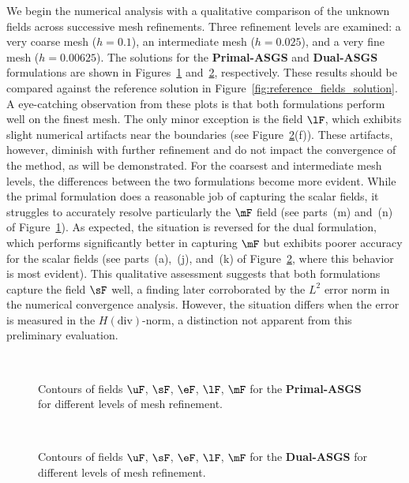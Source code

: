 We begin the numerical analysis with a qualitative comparison of the unknown fields across successive mesh refinements. Three refinement levels are examined: a very coarse mesh ($h = 0.1$), an intermediate mesh ($h = 0.025$), and a very fine mesh ($h = 0.00625$). The solutions for the \textbf{Primal-ASGS} and \textbf{Dual-ASGS} formulations are shown in Figures~\ref{fig:primal_formulation_fields_solution} and~\ref{fig:dual_formulation_fields_solution}, respectively. These results should be compared against the reference solution in Figure~\ref{fig:reference_fields_solution}.
A eye-catching observation from these plots is that both formulations perform well on the finest mesh. The only minor exception is the field $\lF$, which exhibits slight numerical artifacts near the boundaries (see Figure~\ref{fig:dual_formulation_fields_solution}(f)). These artifacts, however, diminish with further refinement and do not impact the convergence of the method, as will be demonstrated. For the coarsest and intermediate mesh levels, the differences between the two formulations become more evident. While the primal formulation does a reasonable job of capturing the scalar fields, it struggles to accurately resolve particularly the $\mF$ field (see parts~(m) and~(n) of Figure~\ref{fig:primal_formulation_fields_solution}). As expected, the situation is reversed for the dual formulation, which performs significantly better in capturing
$\mF$ but exhibits poorer accuracy for the scalar fields (see parts~(a),~(j), and~(k) of Figure~\ref{fig:dual_formulation_fields_solution}, where this behavior is most evident).
This qualitative assessment suggests that both formulations capture the field $\sF$ well, a finding later corroborated by the $L^2$ error norm in the numerical convergence analysis. However, the situation differs when the error is measured in the $H(\text{div})$-norm, a distinction not apparent from this preliminary evaluation.
\begin{figure}[ht!!]
	\centering
	\caption{Contours of fields $\uF$, $\sF$, $\eF$, $\lF$, $\mF$ 
	for the \textbf{Primal-ASGS} for different levels of mesh refinement.}
	~\\
	\def\svgwidth{0.7\columnwidth}
	
	\label{fig:primal_formulation_fields_solution}
\end{figure}

\begin{figure}[ht!!]
	\centering
	\caption{Contours of fields $\uF$, $\sF$, $\eF$, $\lF$, $\mF$ 
	for the \textbf{Dual-ASGS} for different levels of mesh refinement.}
	~\\
	\def\svgwidth{0.7\columnwidth}
	
	\label{fig:dual_formulation_fields_solution}
\end{figure}

